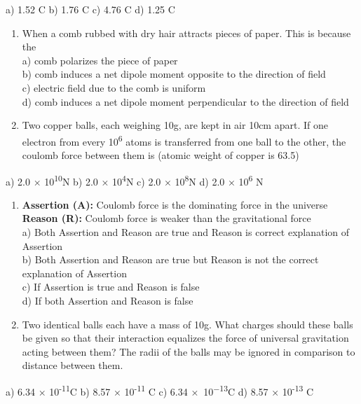 a) 1.52 C b) 1.76 C c) 4.76 C d) 1.25 C

\begin{enumerate}
\def\labelenumi{\arabic{enumi}.}
\setcounter{enumi}{6}
\item
  When a comb rubbed with dry hair attracts pieces of paper. This is
  because the\\
  a) comb polarizes the piece of paper\\
  b) comb induces a net dipole moment opposite to the direction of
  field\\
  c) electric field due to the comb is uniform\\
  d) comb induces a net dipole moment perpendicular to the direction of
  field
\item
  Two copper balls, each weighing 10g, are kept in air 10cm apart. If
  one electron from every 10\textsuperscript{6} atoms is transferred
  from one ball to the other, the coulomb force between them is (atomic
  weight of copper is 63.5)
\end{enumerate}

a) 2.0 × 10\textsuperscript{10}N b) 2.0 × 10\textsuperscript{4}N c) 2.0
× 10\textsuperscript{8}N d) 2.0 × 10\textsuperscript{6} N

\begin{enumerate}
\def\labelenumi{\arabic{enumi}.}
\setcounter{enumi}{8}
\item
  \textbf{Assertion (A):} Coulomb force is the dominating force in the
  universe\\
  \textbf{Reason (R):} Coulomb force is weaker than the gravitational
  force\\
  a) Both Assertion and Reason are true and Reason is correct
  explanation of Assertion\\
  b) Both Assertion and Reason are true but Reason is not the correct
  explanation of Assertion\\
  c) If Assertion is true and Reason is false\\
  d) If both Assertion and Reason is false
\item
  Two identical balls each have a mass of 10g. What charges should these
  balls be given so that their interaction equalizes the force of
  universal gravitation acting between them? The radii of the balls may
  be ignored in comparison to distance between them.
\end{enumerate}

a) 6.34 × 10\textsuperscript{-11}C b) 8.57 × 10\textsuperscript{-11} C
c) 6.34 ×~10\textsuperscript{−13}C d) 8.57 × 10\textsuperscript{-13} C

